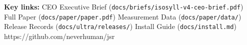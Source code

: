 \documentclass[letterpaper]{article}
\begin{document}
%
  {\textbf{Key links:} CEO Executive Brief (\texttt{docs/briefs/isosyll-v4-ceo-brief.pdf}) \;\textbar\; Full Paper (\texttt{docs/paper/paper.pdf}) \;\textbar\; Measurement Data (\texttt{docs/paper/data/}) \;\textbar\; Release Records (\texttt{docs/ultra/releases/}) \;\textbar\; Install Guide (\texttt{docs/install.md})}%
  {https://github.com/neverhuman/jsr}
\end{document}
